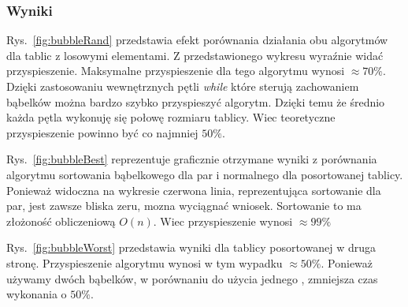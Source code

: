 \subsubsection*{Wyniki}
\par Rys.~\ref{fig:bubbleRand} przedstawia efekt porównania działania obu algorytmów dla tablic z losowymi elementami. Z przedstawionego wykresu wyraźnie widać przyspieszenie. Maksymalne przyspieszenie dla tego algorytmu wynosi $\approx 70\%$. Dzięki zastosowaniu wewnętrznych pętli \textit{while} które sterują zachowaniem bąbelków można bardzo szybko przyspieszyć algorytm. Dzięki temu że średnio każda pętla wykonuję się połowę rozmiaru tablicy. Wiec teoretyczne przyspieszenie powinno być co najmniej $50 \% $.	
\par Rys.~\ref{fig:bubbleBest} reprezentuje graficznie otrzymane wyniki z porównania algorytmu sortowania bąbelkowego dla par i normalnego dla posortowanej tablicy. Ponieważ widoczna na wykresie czerwona linia, reprezentująca sortowanie dla par, jest zawsze bliska zeru, mozna wyciągnać wniosek. Sortowanie to ma złożoność obliczeniową $O(n)$. Wiec przyspieszenie wynosi $\approx 99\%$
\par Rys.~\ref{fig:bubbleWorst} przedstawia wyniki dla tablicy posortowanej w druga stronę. Przyspieszenie algorytmu wynosi w tym wypadku $\approx 50\%$. Ponieważ używamy dwóch bąbelków, w porównaniu do użycia jednego , zmniejsza czas wykonania o $50\%$.


